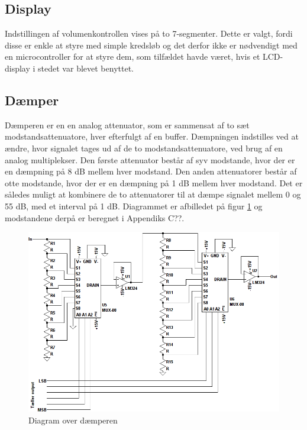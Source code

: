 \subsection*{Display}
\label{volumenkontrol-design-display}
Indstillingen af volumenkontrollen vises på to 7-segmenter. Dette er valgt, fordi disse er enkle at styre med simple kredsløb og det derfor ikke er nødvendigt med en microcontroller for at styre dem, som tilfældet havde været, hvis et LCD-display i stedet var blevet benyttet.

\subsection*{Dæmper}
\label{volumenkontrol-design-daemper}
Dæmperen er en en analog attenuator, som er sammensat af to sæt modstandsattenuatore, hver efterfulgt af en buffer. Dæmpningen indstilles ved at ændre, hvor signalet tages ud af de to modstandsattenuatore, ved brug af en analog multiplekser. Den første attenuator består af syv modstande, hvor der er en dæmpning på 8 dB mellem hver modstand. Den anden attenuatorer består af otte modstande, hvor der er en dæmpning på 1 dB mellem hver modstand. Det er således muligt at kombinere de to attenuatorer til at dæmpe signalet mellem 0 og 55 dB, med et interval på 1 dB. Diagrammet er afbilledet på figur \ref{fig:volumenkontrol_daemper} og modstandene derpå er beregnet i Appendiks C??.

\begin{figure}[h]
\centering
\includegraphics[width=\textwidth]{teknisk/volumenkontrol/daemper.png}
\caption{Diagram over dæmperen}
\label{fig:volumenkontrol_daemper}
\end{figure}

